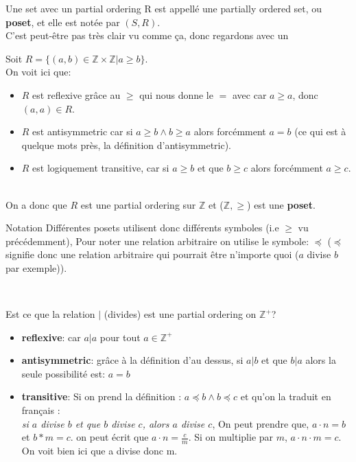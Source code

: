 Une set avec un partial ordering R est appellé une partially ordered set, ou \textbf{poset}, et elle est notée par $(S, R)$.
\\
C'est peut-être pas très clair vu comme ça, donc regardons avec un 

\begin{exemple}
    

Soit $R = \{(a, b) \in \mathbb{Z} \times \mathbb{Z}| a \geq b\}$.
\\
On voit ici que:
\begin{itemize}
    \item $R$ est reflexive grâce au $\geq$ qui nous donne le $=$ avec car $a \geq a$, donc $(a, a) \in R$.
    \item $R$ est antisymmetric car si $a \geq b \wedge b \geq a$ alors forcémment $a = b$ (ce qui est à quelque mots près, la définition d'antisymmetric).
    \item $R$ est logiquement transitive, car si $a \geq b$ et que $b \geq c$ alors forcémment $a \geq c$.
\end{itemize}
\\

On a donc que $R$ est une partial ordering sur $\mathbb{Z}$ et ($\mathbb{Z}, \geq$) est une \textbf{poset}.

\end{exemple}

\begin{framedremark}{Notation}
    Différentes posets utilisent donc différents symboles (i.e $\geq$ vu précédemment), Pour noter une relation arbitraire on utilise le symbole: $\preceq$ ($\preceq$ signifie donc une relation arbitraire qui pourrait être n'importe quoi ($a$ divise $b$ par exemple)).
\end{framedremark}
\\

\begin{exemple}
Est ce que la relation $|$ (divides) est une partial ordering on $\mathbb{Z}^+$?
\begin{itemize}
    \item \textbf{reflexive}: car $a | a$ pour tout $a \in \mathbb{Z}^+$
    \item \textbf{antisymmetric}: grâce à la définition d'au dessus, si $a | b$ et que $b | a$ alors la seule possibilité est: $a = b$
    \item \textbf{transitive}: Si on prend la définition : $a \preceq b \wedge b \preceq c$ et qu'on la traduit en français :
\\
\textit{si $a$ divise $b$ et que $b$ divise $c$, alors $a$ divise $c$}, On peut prendre que, $a\cdot n = b$ et $b * m = c$. on peut écrit que $a\cdot n = \frac{c}{m}$. Si on multiplie par $m$, $a\cdot n \cdot m = c$. On voit bien ici que a divise donc m.

\end{itemize}
\end{exemple}



